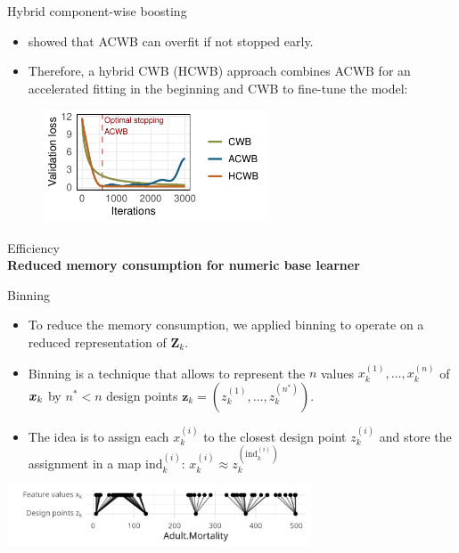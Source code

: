 \documentclass[t,10pt]{beamer}
\newcommand{\fSlide}[2]{
\begin{frame}[plain]{}%
  \vspace{4cm}%
  \Large #1\\[0.2cm]%
  {\LARGE\textbf{#2}}%
	\addtocounter{framenumber}{-1}%
\end{frame}%
}
\begin{document}
\begin{frame}{Hybrid component-wise boosting}
  \begin{itemize}
    \item
      \citet{lu2020accelerating} showed that ACWB can overfit if not stopped early.
    \item
      Therefore, a hybrid CWB (HCWB) approach combines ACWB for an accelerated fitting in the beginning and CWB
      to fine-tune the model:
  \end{itemize}

  \begin{figure}
    \centering
    \includegraphics[width=0.6\textwidth]{figures/fig-HCWB.pdf}
  \end{figure}
\end{frame}

\fSlide{Efficiency}{Reduced memory consumption for numeric base learner}

\begin{frame}{Binning}
  \begin{itemize}
    \item
      To reduce the memory consumption, we applied binning to operate on a
      reduced representation of \(\bm{Z}_k\).
    \item
      Binning is a technique that allows to represent the \(n\) values
      \(x_k^{(1)}, \dots, x_k^{(n)}\) of \(\bm{x}_k\) by \(n^\ast < n\) design
      points \(\bm{z}_k = (z_k^{(1)}, \dots, z_k^{(n^\ast)})\).
    \item
      The idea is to assign each \(x_k^{(i)}\) to the closest design point
      \(z_k^{(i)}\) and store the assignment in a map
      \(\text{ind}_k^{(i)}\):
      \(x_k^{(i)} \approx z_k^{(\text{ind}_k^{(i)})}\)
  \end{itemize}

  \begin{center}\includegraphics[width=9cm]{figures/binning/fig-xbin.png} \end{center}
\end{frame}
\end{document}
